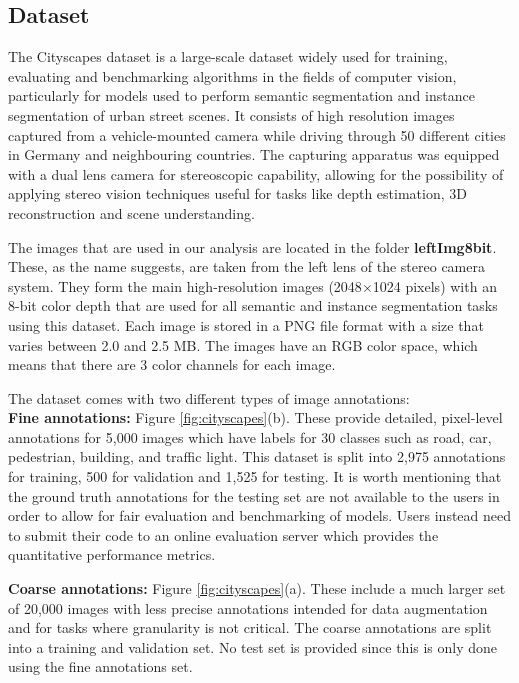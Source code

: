 \subsection{Dataset}

The Cityscapes dataset is a large-scale dataset widely used for training, evaluating and benchmarking algorithms in the fields of computer vision, particularly for models used to perform semantic segmentation and instance segmentation of urban street scenes. It consists of high resolution images captured from a vehicle-mounted camera while driving through 50 different cities in Germany and neighbouring countries. The capturing apparatus was equipped with a dual lens camera for stereoscopic capability, allowing for the possibility of applying stereo vision techniques useful for tasks like depth estimation, 3D reconstruction and scene understanding. 

The images that are used in our analysis are located in the folder \textbf{leftImg8bit}. These, as the name suggests, are taken from the left lens of the stereo camera system. They form the main high-resolution images (2048$\times$1024 pixels) with an 8-bit color depth that are used for all semantic and instance segmentation tasks using this dataset. Each image is stored in a PNG file format with a size that varies between 2.0 and 2.5 MB. The images have an RGB color space, which means that there are 3 color channels for each image.

The dataset comes with two different types of image annotations:\\
\textbf{Fine annotations:} Figure \ref{fig:cityscapes}(b). These provide detailed, pixel-level annotations for 5,000 images which have labels for 30 classes such as road, car, pedestrian, building, and traffic light. This dataset is split into 2,975 annotations for training, 500 for validation and 1,525 for testing. It is worth mentioning that the ground truth annotations for the testing set are not available to the users in order to allow for fair evaluation and benchmarking of models. Users instead need to submit their code to an online evaluation server which provides the quantitative performance metrics.    

\textbf{Coarse annotations:} Figure \ref{fig:cityscapes}(a). These include a much larger set of 20,000 images with less precise annotations intended for data augmentation and for tasks where granularity is not critical. The coarse annotations are split into a training and validation set. No test set is provided since this is only done using the fine annotations set. 

